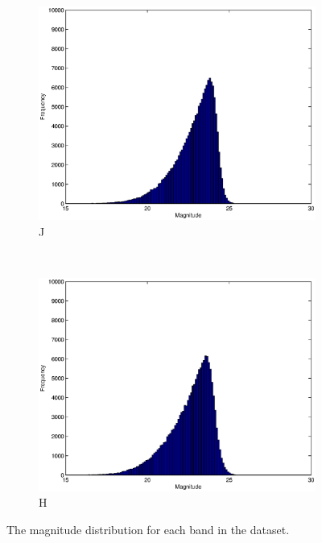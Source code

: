 \documentclass[useAMS,usenatbib,fleqn]{mn2e}
\begin{document}
\begin{figure}
\begin{subfigure}[b]{0.15\textwidth}
                \includegraphics[width=\columnwidth]{figures/J.eps}
                \caption{J}
        \end{subfigure}
         ~
        \begin{subfigure}[b]{0.15\textwidth}
                \includegraphics[width=\columnwidth]{figures/H.eps}
                \caption{H}
        \end{subfigure}
        
       \caption{The magnitude distribution for each band in the dataset.} 
	\label{fig-bands-histograms}
\end{figure}
\end{document}
